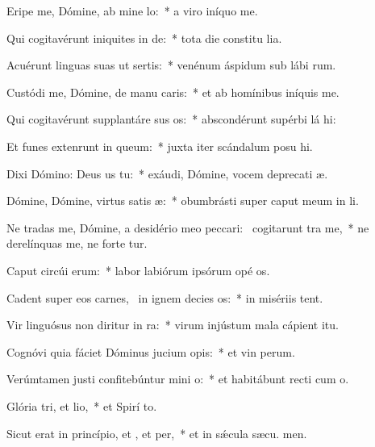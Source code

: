 \item Eripe me, Dómine, ab mine lo:~* a viro iníquo  me.
\item Qui cogitavérunt iniquites in de:~* tota die constitu lia.
\item Acuérunt linguas suas ut sertis:~* venénum áspidum sub lábi rum.
\item Custódi me, Dómine, de manu caris:~* et ab homínibus iníquis  me.
\item Qui cogitavérunt supplantáre sus os:~* abscondérunt supérbi lá hi:
\item Et funes extenrunt in queum:~* juxta iter scándalum posu hi.
\item Dixi Dómino: Deus us  tu:~* exáudi, Dómine, vocem deprecati æ.
\item Dómine, Dómine, virtus satis æ:~* obumbrásti super caput meum in  li.
\item Ne tradas me, Dómine, a desidério meo peccari:~\pscross{} cogitarunt tra me,~* ne derelínquas me, ne forte tur.
\item Caput circúi erum:~* labor labiórum ipsórum opé os.
\item Cadent super eos carnes,~\pscross{} in ignem decies os:~* in misériis  tent.
\item Vir linguósus non diritur in ra:~* virum injústum mala cápient  itu.
\item Cognóvi quia fáciet Dóminus jucium opis:~* et vin perum.
\item Verúmtamen justi confitebúntur mini o:~* et habitábunt recti cum  o.
\item Glória tri, et lio,~* et Spirí to.
\item Sicut erat in princípio, et , et per,~* et in sǽcula sæcu. men.
